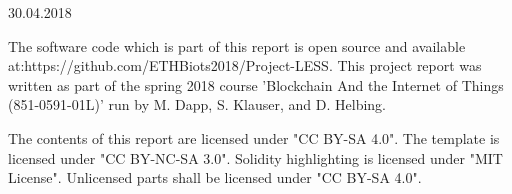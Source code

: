 \documentclass[10pp]{article}
\begin{document}
\begin{titlepage}

{\large 30.04.2018}\\[2cm] %




 
\vfill %

\end{titlepage}


\thispagestyle{empty}
{\small
\strut\vfill %
\vspace{0.2cm}
\noindent The software code which is part of this report is open source and available at:\newline https://github.com/ETHBiots2018/Project-LESS.
\newline
\newline 
This project report was written as part of the spring 2018 course 'Blockchain And the Internet of Things (851-0591-01L)' run by M. Dapp, S. Klauser, and D. Helbing.
}
\newline
\newline
\noindent The contents of this report are licensed under "CC BY-SA 4.0". The template is licensed under "CC BY-NC-SA 3.0". Solidity highlighting is licensed under "MIT License". Unlicensed parts shall be licensed under "CC BY-SA 4.0".
\clearpage
\end{document}
